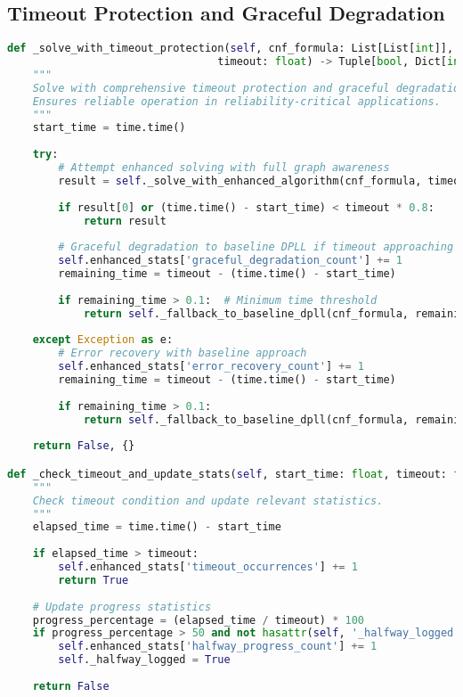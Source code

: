 \subsection{Timeout Protection and Graceful Degradation}
\label{appendix:timeout-protection}

\begin{lstlisting}[language=Python, caption=Robust Timeout Protection with Graceful Degradation]
def _solve_with_timeout_protection(self, cnf_formula: List[List[int]], 
                                 timeout: float) -> Tuple[bool, Dict[int, bool]]:
    """
    Solve with comprehensive timeout protection and graceful degradation.
    Ensures reliable operation in reliability-critical applications.
    """
    start_time = time.time()
    
    try:
        # Attempt enhanced solving with full graph awareness
        result = self._solve_with_enhanced_algorithm(cnf_formula, timeout, start_time)
        
        if result[0] or (time.time() - start_time) < timeout * 0.8:
            return result
        
        # Graceful degradation to baseline DPLL if timeout approaching
        self.enhanced_stats['graceful_degradation_count'] += 1
        remaining_time = timeout - (time.time() - start_time)
        
        if remaining_time > 0.1:  # Minimum time threshold
            return self._fallback_to_baseline_dpll(cnf_formula, remaining_time)
        
    except Exception as e:
        # Error recovery with baseline approach
        self.enhanced_stats['error_recovery_count'] += 1
        remaining_time = timeout - (time.time() - start_time)
        
        if remaining_time > 0.1:
            return self._fallback_to_baseline_dpll(cnf_formula, remaining_time)
    
    return False, {}

def _check_timeout_and_update_stats(self, start_time: float, timeout: float) -> bool:
    """
    Check timeout condition and update relevant statistics.
    """
    elapsed_time = time.time() - start_time
    
    if elapsed_time > timeout:
        self.enhanced_stats['timeout_occurrences'] += 1
        return True
    
    # Update progress statistics
    progress_percentage = (elapsed_time / timeout) * 100
    if progress_percentage > 50 and not hasattr(self, '_halfway_logged'):
        self.enhanced_stats['halfway_progress_count'] += 1
        self._halfway_logged = True
    
    return False
\end{lstlisting}